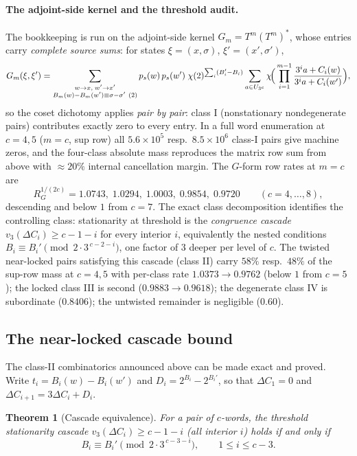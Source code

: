 \documentclass[11pt]{article}
\theoremstyle{plain}
\newtheorem{theorem}{Theorem}
\theoremstyle{definition}
\theoremstyle{remark}
\begin{document}
\paragraph{The adjoint-side kernel and the threshold audit.} The
bookkeeping is run on the adjoint-side kernel $G_m=T^m(T^m)^*$, whose
entries carry \emph{complete source sums}: for states $\xi=(x,\sigma)$,
$\xi'=(x',\sigma')$,
\[
G_m(\xi,\xi')
=\sum_{\substack{w\to x,\;w'\to x'\\ B_m(w)-B_m(w')\equiv\sigma-\sigma'\ (2)}}
p_s(w)\,p_s(w')\;\chi(2)^{\sum_i(B_i'-B_i)}
\sum_{a\in U_{3^c}}\chi\!\Bigl(\,\prod_{i=1}^{m-1}
\frac{3^ia+C_i(w)}{3^ia+C_i(w')}\Bigr),
\]
so the coset dichotomy applies \emph{pair by pair}: class I (nonstationary
nondegenerate pairs) contributes exactly zero to every entry. In a full word
enumeration at $c=4,5$ ($m=c$, sup row) all $5.6\times10^5$ resp.\
$8.5\times10^6$ class-I pairs give machine zeros, and the four-class
absolute mass reproduces the matrix row sum from above with $\approx20\%$
internal cancellation margin. The $G$-form row rates at $m=c$ are
\[
R_G^{1/(2c)}=1.0743,\;1.0294,\;1.0003,\;0.9854,\;0.9720
\qquad(c=4,\dots,8),
\]
descending and below $1$ from $c=7$. The exact class decomposition
identifies the controlling class: stationarity at threshold is the
\emph{congruence cascade} $v_3(\Delta C_i)\ge c-1-i$ for every interior $i$,
equivalently the nested conditions $B_i\equiv B_i'\pmod{2\cdot3^{\,c-2-i}}$,
one factor of $3$ deeper per level of $c$. The twisted near-locked pairs
satisfying this cascade (class II) carry $58\%$ resp.\ $48\%$ of the sup-row
mass at $c=4,5$ with per-class rate $1.0373\to0.9762$ (below $1$ from
$c=5$); the locked class III is second ($0.9883\to0.9618$); the degenerate
class IV is subordinate ($0.8406$); the untwisted remainder is negligible
($0.60$).

\subsection*{The near-locked cascade bound}

The class-II combinatorics announced above can be made exact and proved.
Write $t_i=B_i(w)-B_i(w')$ and $D_i=2^{B_i}-2^{B_i'}$, so that
$\Delta C_1=0$ and $\Delta C_{i+1}=3\Delta C_i+D_i$.

\begin{theorem}[Cascade equivalence]\label{thm:cascade}
For a pair of $c$-words, the threshold stationarity cascade
$v_3(\Delta C_i)\ge c-1-i$ (all interior $i$) holds \emph{if and only if}
\[
B_i\equiv B_i'\pmod{2\cdot3^{\,c-3-i}},\qquad 1\le i\le c-3.
\]
\end{theorem}
\end{document}
